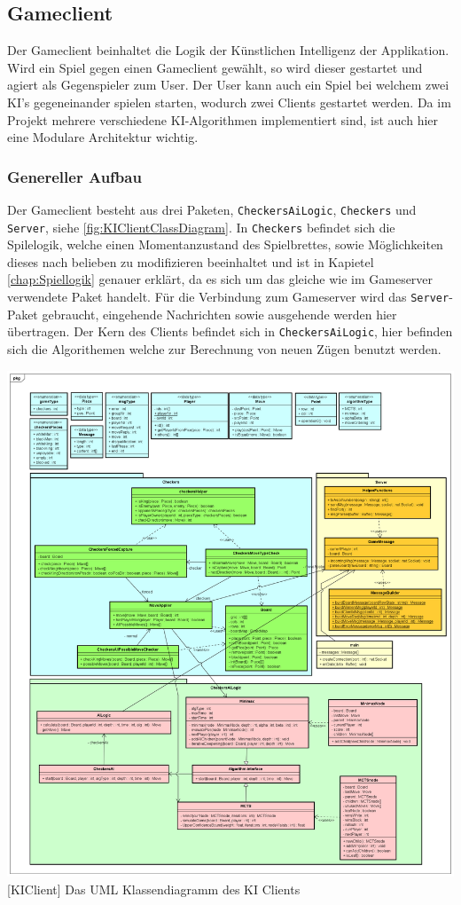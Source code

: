 \documentclass[12pt,a4paper,bibliography=totocnumbered,listof=totocnumbered]{article}
\begin{document}
\subsection{Gameclient}
Der Gameclient beinhaltet die Logik der Künstlichen Intelligenz der Applikation. Wird ein Spiel gegen einen Gameclient gewählt, so wird dieser gestartet und agiert als 
Gegenspieler zum User. Der User kann auch ein Spiel bei welchem zwei KI's gegeneinander spielen starten, wodurch zwei Clients gestartet werden.
Da im Projekt mehrere verschiedene KI-Algorithmen implementiert sind, ist auch hier eine Modulare Architektur wichtig.

\subsubsection{Genereller Aufbau}
Der Gameclient besteht aus drei Paketen, \texttt{CheckersAiLogic}, \texttt{Checkers} und \texttt{Server}, siehe \ref{fig:KIClientClassDiagram}. 
In \texttt{Checkers} befindet sich die Spilelogik, welche einen Momentanzustand des Spielbrettes, sowie Möglichkeiten dieses nach belieben zu modifizieren beeinhaltet 
und ist in Kapietel \ref{chap:Spiellogik} genauer erklärt, da es sich um das gleiche wie im Gameserver verwendete Paket handelt. 
Für die Verbindung zum Gameserver wird das \texttt{Server}-Paket gebraucht, eingehende Nachrichten sowie ausgehende werden hier übertragen.
Der Kern des Clients befindet sich in \texttt{CheckersAiLogic}, hier befinden sich die Algorithemen welche zur Berechnung von neuen Zügen 
benutzt werden.

\vspace{1em}
\begin{minipage}{\linewidth}
	\centering
	\includegraphics[width=0.9\linewidth]{pics/GameClientClassDiagram.png}
	[KIClient]{ Das UML Klassendiagramm des KI Clients }
	\label{fig:KIClientClassDiagram}
\end{minipage}
\end{document}
